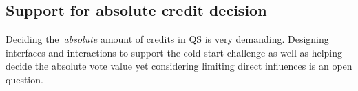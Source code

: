\subsection{Support for absolute credit decision}
Deciding the~\textit{absolute} amount of credits in QS is very demanding. Designing interfaces and interactions to support the cold start challenge as well as helping decide the absolute vote value yet considering limiting direct influences is an open question.









